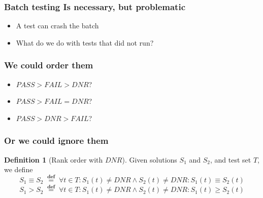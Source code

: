 \documentclass[svgnames,14pt]{beamer}
\newcommand\dnr{\ensuremath{\mathit{DNR}}}
\newcommand\fail{\mathit{FAIL}}
\newcommand\pass{\mathit{PASS}}
\newcommand\defined{\mathrel{\;\stackrel{\scriptscriptstyle\mathbf{def}}{=}\;}}
\theoremstyle{definition}
\newtheorem{defn}{Definition}
\begin{document}
\begin{frame}
\frametitle{Batch testing Is necessary, but problematic}
\begin{itemize}
\item A test can crash the batch
\item What do we do with tests that did not run?
\end{itemize}
\end{frame}

\begin{frame}
\frametitle{We could order them}
\begin{itemize}
\item $\pass>\fail>\dnr$?
\item $\pass>\fail=\dnr$?
\item $\pass>\dnr>\fail$?
\end{itemize}
\end{frame}

\begin{frame}
\frametitle{Or we could ignore them}
\begin{defn}[Rank order with \dnr]
Given solutions $S_1$ and $S_2$, and test set $T$, we define
$$S_1 \equiv S_2 \defined \forall t \in T : S_1(t) \neq \dnr \wedge S_2(t) \neq \dnr : S_1(t) \equiv S_2(t)$$
$$S_1 > S_2 \defined \forall t \in T : S_1(t) \neq \dnr \wedge S_2(t) \neq \dnr : S_1(t) \geq S_2(t)$$
\end{defn}
\end{frame}
\end{document}
